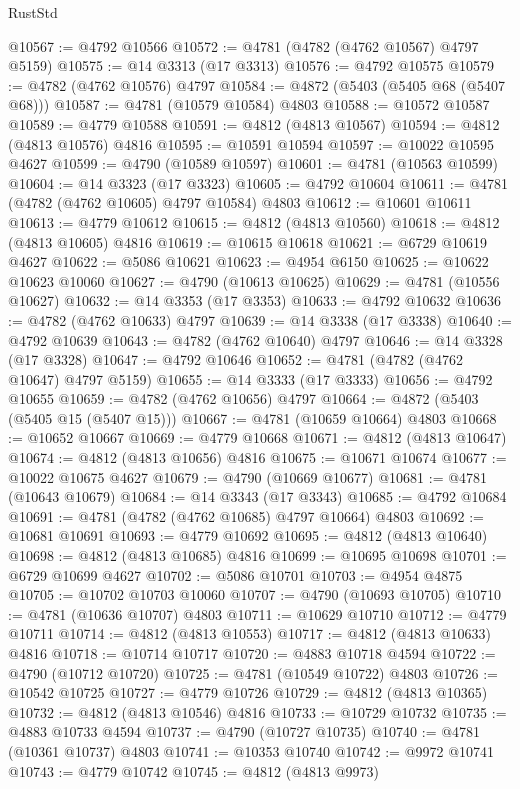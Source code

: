 \begin{lexlean}{RustStd}
\begin{coremodule}
@10567 := @4792 @10566
@10572 := @4781 (@4782 (@4762 @10567) @4797 @5159)
@10575 := @14 @3313 (@17 @3313)
@10576 := @4792 @10575
@10579 := @4782 (@4762 @10576) @4797
@10584 := @4872 (@5403 (@5405 @68 (@5407 @68)))
@10587 := @4781 (@10579 @10584) @4803
@10588 := @10572 @10587
@10589 := @4779 @10588
@10591 := @4812 (@4813 @10567)
@10594 := @4812 (@4813 @10576) @4816
@10595 := @10591 @10594
@10597 := @10022 @10595 @4627
@10599 := @4790 (@10589 @10597)
@10601 := @4781 (@10563 @10599)
@10604 := @14 @3323 (@17 @3323)
@10605 := @4792 @10604
@10611 := @4781 (@4782 (@4762 @10605) @4797 @10584) @4803
@10612 := @10601 @10611
@10613 := @4779 @10612
@10615 := @4812 (@4813 @10560)
@10618 := @4812 (@4813 @10605) @4816
@10619 := @10615 @10618
@10621 := @6729 @10619 @4627
@10622 := @5086 @10621
@10623 := @4954 @6150
@10625 := @10622 @10623 @10060
@10627 := @4790 (@10613 @10625)
@10629 := @4781 (@10556 @10627)
@10632 := @14 @3353 (@17 @3353)
@10633 := @4792 @10632
@10636 := @4782 (@4762 @10633) @4797
@10639 := @14 @3338 (@17 @3338)
@10640 := @4792 @10639
@10643 := @4782 (@4762 @10640) @4797
@10646 := @14 @3328 (@17 @3328)
@10647 := @4792 @10646
@10652 := @4781 (@4782 (@4762 @10647) @4797 @5159)
@10655 := @14 @3333 (@17 @3333)
@10656 := @4792 @10655
@10659 := @4782 (@4762 @10656) @4797
@10664 := @4872 (@5403 (@5405 @15 (@5407 @15)))
@10667 := @4781 (@10659 @10664) @4803
@10668 := @10652 @10667
@10669 := @4779 @10668
@10671 := @4812 (@4813 @10647)
@10674 := @4812 (@4813 @10656) @4816
@10675 := @10671 @10674
@10677 := @10022 @10675 @4627
@10679 := @4790 (@10669 @10677)
@10681 := @4781 (@10643 @10679)
@10684 := @14 @3343 (@17 @3343)
@10685 := @4792 @10684
@10691 := @4781 (@4782 (@4762 @10685) @4797 @10664) @4803
@10692 := @10681 @10691
@10693 := @4779 @10692
@10695 := @4812 (@4813 @10640)
@10698 := @4812 (@4813 @10685) @4816
@10699 := @10695 @10698
@10701 := @6729 @10699 @4627
@10702 := @5086 @10701
@10703 := @4954 @4875
@10705 := @10702 @10703 @10060
@10707 := @4790 (@10693 @10705)
@10710 := @4781 (@10636 @10707) @4803
@10711 := @10629 @10710
@10712 := @4779 @10711
@10714 := @4812 (@4813 @10553)
@10717 := @4812 (@4813 @10633) @4816
@10718 := @10714 @10717
@10720 := @4883 @10718 @4594
@10722 := @4790 (@10712 @10720)
@10725 := @4781 (@10549 @10722) @4803
@10726 := @10542 @10725
@10727 := @4779 @10726
@10729 := @4812 (@4813 @10365)
@10732 := @4812 (@4813 @10546) @4816
@10733 := @10729 @10732
@10735 := @4883 @10733 @4594
@10737 := @4790 (@10727 @10735)
@10740 := @4781 (@10361 @10737) @4803
@10741 := @10353 @10740
@10742 := @9972 @10741
@10743 := @4779 @10742
@10745 := @4812 (@4813 @9973)

\end{coremodule}
\end{lexlean}
